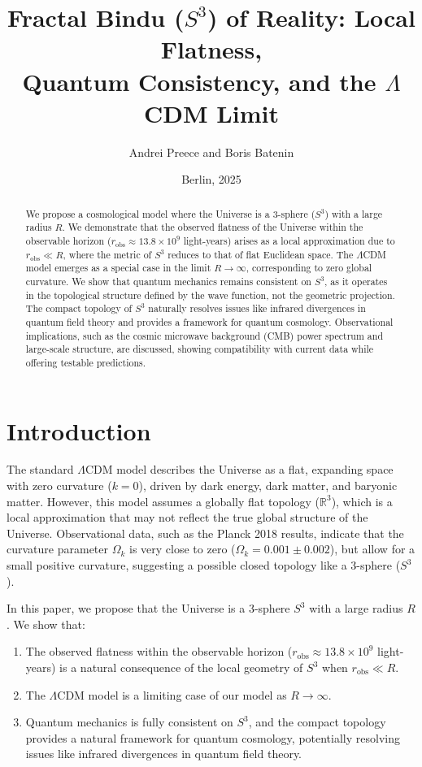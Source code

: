 \documentclass[12pt]{article}
\title{Fractal Bindu (\(S^3\)) of Reality: Local Flatness,\\
Quantum Consistency, and the \(\Lambda\)CDM Limit}
\author{Andrei Preece and Boris Batenin}
\date{Berlin, 2025}
\begin{document}
\maketitle

\begin{abstract}
We propose a cosmological model where the Universe is a 3-sphere (\(S^3\)) with a large radius \(R\). We demonstrate that the observed flatness of the Universe within the observable horizon (\(r_{\mathrm{obs}} \approx 13.8 \times 10^9\) light-years) arises as a local approximation due to \(r_{\mathrm{obs}} \ll R\), where the metric of \(S^3\) reduces to that of flat Euclidean space. The \(\Lambda\)CDM model emerges as a special case in the limit \(R \to \infty\), corresponding to zero global curvature. We show that quantum mechanics remains consistent on \(S^3\), as it operates in the topological structure defined by the wave function, not the geometric projection. The compact topology of \(S^3\) naturally resolves issues like infrared divergences in quantum field theory and provides a framework for quantum cosmology. Observational implications, such as the cosmic microwave background (CMB) power spectrum and large-scale structure, are discussed, showing compatibility with current data while offering testable predictions.
\end{abstract}

\section{Introduction}

The standard \(\Lambda\)CDM model describes the Universe as a flat, expanding space with zero curvature (\(k = 0\)), driven by dark energy, dark matter, and baryonic matter. However, this model assumes a globally flat topology (\(\mathbb{R}^3\)), which is a local approximation that may not reflect the true global structure of the Universe. Observational data, such as the Planck 2018 results, indicate that the curvature parameter \(\Omega_k\) is very close to zero (\(\Omega_k = 0.001 \pm 0.002\)), but allow for a small positive curvature, suggesting a possible closed topology like a 3-sphere (\(S^3\)).

In this paper, we propose that the Universe is a 3-sphere \(S^3\) with a large radius \(R\). We show that:
\begin{enumerate}
\item The observed flatness within the observable horizon (\(r_{\mathrm{obs}} \approx 13.8 \times 10^9\) light-years) is a natural consequence of the local geometry of \(S^3\) when \(r_{\mathrm{obs}} \ll R\).
\item The \(\Lambda\)CDM model is a limiting case of our model as \(R \to \infty\).
\item Quantum mechanics is fully consistent on \(S^3\), and the compact topology provides a natural framework for quantum cosmology, potentially resolving issues like infrared divergences in quantum field theory.
\end{enumerate}
\end{document}
